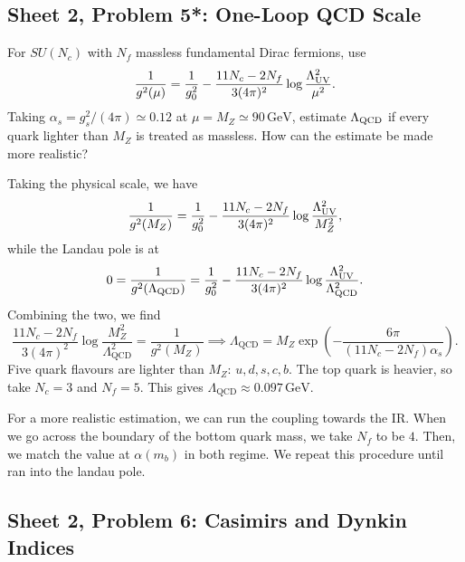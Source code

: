 \subsection{Sheet 2, Problem 5*: One-Loop QCD Scale}

For $SU(N_c)$ with $N_f$ massless fundamental Dirac fermions, use
\begin{equation}
    \frac1{g^2(\mu)}=\frac1{g_0^2}
    -\frac{11N_c-2N_f}{3(4\pi)^2}
    \log\frac{\Lambda_{\rm UV}^2}{\mu^2}.
\end{equation}
Taking $\alpha_s=g_s^2/(4\pi)\simeq0.12$ at
$\mu=M_Z\simeq90\,\mathrm{GeV}$, estimate $\Lambda_{\rm QCD}$
if every quark lighter than $M_Z$ is treated as massless.
How can the estimate be made more realistic?
\begin{solution}
    Taking the physical scale, we have
    \begin{equation}
        \frac{1}{g^2(M_Z)} =  \frac{1}{g_0^2} -\frac{11N_c-2N_f}{3(4\pi)^2}
    \log\frac{\Lambda_{\rm UV}^2}{M_Z^2},
    \end{equation}
    while the Landau pole is at
    \begin{equation}
         0 = \frac{1}{g^2(\Lambda_\mathrm{QCD})} =  \frac{1}{g_0^2} -\frac{11N_c-2N_f}{3(4\pi)^2}
    \log\frac{\Lambda_{\rm UV}^2}{\Lambda_\mathrm{QCD}^2}.
    \end{equation}
    Combining the two, we find
    \begin{equation}
        \frac{11N_c-2N_f}{3(4\pi)^2}
    \log\frac{M_Z^2}{\Lambda_\mathrm{QCD}^2} = \frac{1}{g^2(M_Z)} \implies \Lambda_{\mathrm{QCD}}=  M_Z\exp\left(-\frac{6\pi}{(11N_c - 2N_f)\alpha_s}\right).
    \label{eq:LandauPole}
    \end{equation}
    Five quark flavours are lighter than \(M_Z\): \(u,d,s,c,b\). The top quark is heavier, so take \(N_c=3\) and \(N_f=5\). This gives $\Lambda_\mathrm{QCD} \approx 0.097\,\mathrm{GeV}$.

    For a more realistic estimation, we can run the coupling towards the IR. When we go across the boundary of the bottom quark mass, we take $N_f$ to be $4$. Then, we match the value at $\alpha(m_b)$ in both regime. We repeat this procedure until ran into the landau pole.
\end{solution}

\subsection{Sheet 2, Problem 6: Casimirs and Dynkin Indices}

